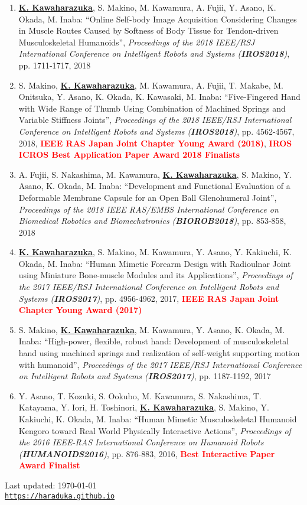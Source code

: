 \documentclass[letterpaper]{article}
\def\footerlink{https://haraduka.github.io}
\begin{document}
\begin{enumerate}
\item \underline{\textbf{K. Kawaharazuka}}, S. Makino, M. Kawamura, A. Fujii, Y. Asano, K. Okada, M. Inaba: ``Online Self-body Image Acquisition Considering Changes in Muscle Routes Caused by Softness of Body Tissue for Tendon-driven Musculoskeletal Humanoids'', \textit{Proceedings of the 2018 IEEE/RSJ International Conference on Intelligent Robots and Systems (\textit{\textbf{IROS2018}})}, pp. 1711-1717, 2018
\item S. Makino, \underline{\textbf{K. Kawaharazuka}}, M. Kawamura, A. Fujii, T. Makabe, M. Onitsuka, Y. Asano, K. Okada, K. Kawasaki, M. Inaba: ``Five-Fingered Hand with Wide Range of Thumb Using Combination of Machined Springs and Variable Stiffness Joints'', \textit{Proceedings of the 2018 IEEE/RSJ International Conference on Intelligent Robots and Systems (\textit{\textbf{IROS2018}})}, pp. 4562-4567, 2018, \textbf{\textcolor{red}{IEEE RAS Japan Joint Chapter Young Award (2018)}}, \textbf{\textcolor{red}{IROS ICROS Best Application Paper Award 2018 Finalists}}
\item A. Fujii, S. Nakashima, M. Kawamura, \underline{\textbf{K. Kawaharazuka}}, S. Makino, Y. Asano, K. Okada, M. Inaba: ``Development and Functional Evaluation of a Deformable Membrane Capsule for an Open Ball Glenohumeral Joint'', \textit{Proceedings of the 2018 IEEE RAS/EMBS International Conference on Biomedical Robotics and Biomechatronics (\textit{\textbf{BIOROB2018}})}, pp. 853-858, 2018
\item \underline{\textbf{K. Kawaharazuka}}, S. Makino, M. Kawamura, Y. Asano, Y. Kakiuchi, K. Okada, M. Inaba: ``Human Mimetic Forearm Design with Radioulnar Joint using Miniature Bone-muscle Modules and its Applications'', \textit{Proceedings of the 2017 IEEE/RSJ International Conference on Intelligent Robots and Systems (\textit{\textbf{IROS2017}})}, pp. 4956-4962, 2017, \textbf{\textcolor{red}{IEEE RAS Japan Joint Chapter Young Award (2017)}}
\item S. Makino, \underline{\textbf{K. Kawaharazuka}}, M. Kawamura, Y. Asano, K. Okada, M. Inaba: ``High-power, flexible, robust hand: Development of musculoskeletal hand using machined springs and realization of self-weight supporting motion with humanoid'', \textit{Proceedings of the 2017 IEEE/RSJ International Conference on Intelligent Robots and Systems (\textit{\textbf{IROS2017}})}, pp. 1187-1192, 2017
\item Y. Asano, T. Kozuki, S. Ookubo, M. Kawamura, S. Nakashima, T. Katayama, Y. Iori, H. Toshinori, \underline{\textbf{K. Kawaharazuka}}, S. Makino, Y. Kakiuchi, K. Okada, M. Inaba: ``Human Mimetic Musculoskeletal Humanoid Kengoro toward Real World Physically Interactive Actions'', \textit{Proceedings of the 2016 IEEE-RAS International Conference on Humanoid Robots (\textit{\textbf{HUMANOIDS2016}})}, pp. 876-883, 2016, \textbf{\textcolor{red}{Best Interactive Paper Award Finalist}}
\end{enumerate}


\bigskip

\begin{center}
  \begin{footnotesize}
    Last updated: \today \\
    \href{\footerlink}{\texttt{\footerlink}}
  \end{footnotesize}
\end{center}
\end{document}
